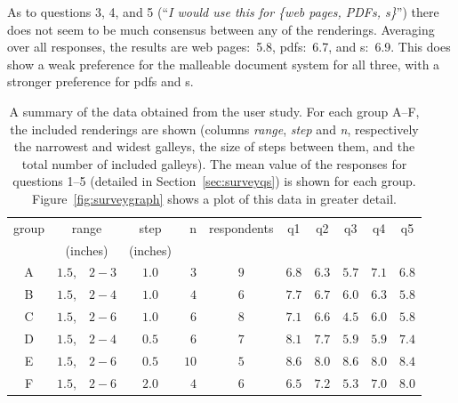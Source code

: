 As to questions 3, 4, and 5 (``\emph{I would use this for \emph{\{}web pages, PDFs, \ebook s\emph{\}}}'') there does not seem to be much consensus between any of the renderings. Averaging over all responses, the results are web pages:~5.8, \glspl{pdf}:~6.7, and \ebook s:~6.9. This does show a weak preference for the malleable document system for all three, with a stronger preference for \glspl{pdf} and \ebook s.


\begin{table}
  \footnotesize
  \myfloatalign
  \begin{tabular}{cccrcccccc}
    \toprule
    group & range & step & n & respondents & q1 & q2 & q3 & q4 & q5 \\
	& (inches) & (inches) \\
    \midrule
    A & $1.5$,~~$2-3$ & $1.0$ & $3$  & $9$ & $6.8$ & $6.3$ & $5.7$ & $7.1$ & $6.8$ \\
    B & $1.5$,~~$2-4$ & $1.0$ & $4$  & $6$ & $7.7$ & $6.7$ & $6.0$ & $6.3$ & $5.8$ \\
    C & $1.5$,~~$2-6$ & $1.0$ & $6$  & $8$ & $7.1$ & $6.6$ & $4.5$ & $6.0$ & $5.8$ \\
    D & $1.5$,~~$2-4$ & $0.5$ & $6$  & $7$ & $8.1$ & $7.7$ & $5.9$ & $5.9$ & $7.4$ \\
    E & $1.5$,~~$2-6$ & $0.5$ & $10$ & $5$ & $8.6$ & $8.0$ & $8.6$ & $8.0$ & $8.4$ \\
    F & $1.5$,~~$2-6$ & $2.0$ & $4$  & $6$ & $6.5$ & $7.2$ & $5.3$ & $7.0$ & $8.0$ \\
    \bottomrule
\end{tabular}
  \caption[Summary of user study results]{A summary of the data obtained from the user study. For each group A--F, the included renderings are shown (columns \emph{range}, \emph{step} and \emph{n}, respectively the narrowest and widest galleys, the size of steps between them, and the total number of included galleys). The mean value of the responses for questions 1--5 (detailed in Section~\ref{sec:surveyqs}) is shown for each group. Figure~\ref{fig:surveygraph} shows a plot of this data in greater detail.}
  \label{tab:sampledocs}
\end{table}


